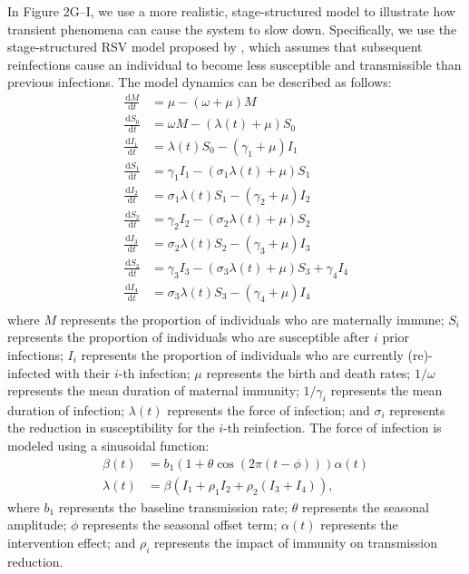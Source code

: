 \documentclass[12pt]{article}
\newcommand{\dd}[1]{\ensuremath{\, \mathrm{d}#1}}
\begin{document}
In Figure 2G--I, we use a more realistic, stage-structured model to illustrate how transient phenomena can cause the system to slow down.
Specifically, we use the stage-structured RSV model proposed by \citep{pitzer2015environmental}, which assumes that subsequent reinfections cause an individual to become less susceptible and transmissible than previous infections.
The model dynamics can be described as follows:
\begin{align}
\frac{\dd M}{\dd t} &= \mu - (\omega + \mu) M\\
\frac{\dd S_0}{\dd t} &= \omega M - (\lambda(t) + \mu) S_0\\
\frac{\dd I_1}{\dd t} &= \lambda(t) S_0 - (\gamma_1 + \mu) I_1\\
\frac{\dd S_1}{\dd t} &= \gamma_1 I_1 - (\sigma_1 \lambda(t) + \mu) S_1\\
\frac{\dd I_2}{\dd t} &= \sigma_1 \lambda(t) S_1 - (\gamma_2 + \mu) I_2\\
\frac{\dd S_2}{\dd t} &= \gamma_2 I_2 - (\sigma_2 \lambda(t) + \mu) S_2\\
\frac{\dd I_3}{\dd t} &= \sigma_2 \lambda(t) S_2 - (\gamma_3 + \mu) I_3\\
\frac{\dd S_3}{\dd t} &= \gamma_3 I_3 - (\sigma_3 \lambda(t) + \mu) S_3 + \gamma_4 I_4\\
\frac{\dd I_4}{\dd t} &= \sigma_3 \lambda(t) S_3 - (\gamma_4 + \mu) I_4\\
\end{align}
where $M$ represents the proportion of individuals who are maternally immune;
$S_i$ represents the proportion of individuals who are susceptible after $i$ prior infections;
$I_i$ represents the proportion of individuals who are currently (re)-infected with their $i$-th infection;
$\mu$ represents the birth and death rates;
$1/\omega$ represents the mean duration of maternal immunity;
$1/\gamma_i$ represents the mean duration of infection;
$\lambda(t)$ represents the force of infection;
and $\sigma_i$ represents the reduction in susceptibility for the $i$-th reinfection.
The force of infection is modeled using a sinusoidal function:
\begin{align}
\beta(t) &= b_1 (1 + \theta \cos(2 \pi (t-\phi))) \alpha(t)\\
\lambda(t) &= \beta (I_1 + \rho_1 I_2 + \rho_2 (I_3 + I_4)), 
\end{align}
where $b_1$ represents the baseline transmission rate; $\theta$ represents the seasonal amplitude; $\phi$ represents the seasonal offset term; $\alpha(t)$ represents the intervention effect; and $\rho_i$ represents the impact of immunity on transmission reduction.
\end{document}
